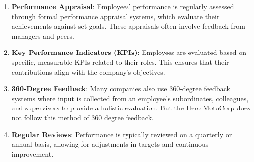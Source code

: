 \begin{enumerate}

	\item \textbf{Performance Appraisal}: Employees' performance is regularly assessed through formal performance appraisal systems, which evaluate their achievements against set goals. These appraisals often involve feedback from managers and peers.

	\item \textbf{Key Performance Indicators (KPIs)}: Employees are evaluated based on specific, measurable KPIs related to their roles. This ensures that their contributions align with the company's objectives.

	\item \textbf{360-Degree Feedback}: Many companies also use 360-degree feedback systems where input is collected from an employee's subordinates, colleagues, and supervisors to provide a holistic evaluation. But the Hero MotoCorp does not follow this method of 360 degree feedback.

	\item \textbf{Regular Reviews}: Performance is typically reviewed on a quarterly or annual basis, allowing for adjustments in targets and continuous improvement.
\end{enumerate}